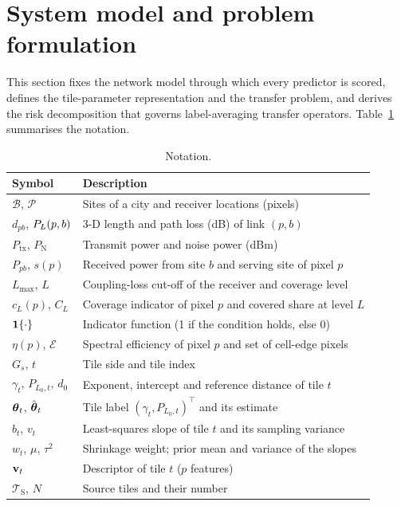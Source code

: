 \section{System model and problem formulation}
\label{sec:model}

This section fixes the network model through which every predictor is
scored, defines the tile-parameter representation and the transfer problem,
and derives the risk decomposition that governs label-averaging transfer
operators. Table~\ref{tab:notation} summarises the notation.

\begin{table}[!tp]
\centering
\caption{Notation.}
\label{tab:notation}
\footnotesize\setlength{\tabcolsep}{4pt}
\begin{tabular}{ll}
\toprule
Symbol & Description \\
\midrule
$\mathcal{B}$, $\mathcal{P}$ & Sites of a city and receiver locations (pixels) \\
$d_{pb}$, $P_{L}(p,b)$ & 3-D length and path loss (dB) of link $(p,b)$ \\
$P_{\mathrm{tx}}$, $P_{\mathrm{N}}$ & Transmit power and noise power (dBm) \\
$P_{pb}$, $s(p)$ & Received power from site $b$ and serving site of pixel $p$ \\
$L_{\max}$, $L$ & Coupling-loss cut-off of the receiver and coverage level \\
$c_L(p)$, $C_L$ & Coverage indicator of pixel $p$ and covered share at level $L$ \\
$\mathbf{1}\{\cdot\}$ & Indicator function (1 if the condition holds, else 0) \\
$\eta(p)$, $\mathcal{E}$ & Spectral efficiency of pixel $p$ and set of cell-edge pixels \\
$G_s$, $t$ & Tile side and tile index \\
$\gamma_t$, $P_{L_0,t}$, $d_0$ & Exponent, intercept and reference distance of tile $t$ \\
$\boldsymbol{\theta}_t$, $\hat{\boldsymbol{\theta}}_t$ & Tile label $(\gamma_t,P_{L_0,t})^{\top}$ and its estimate \\
$b_t$, $v_t$ & Least-squares slope of tile $t$ and its sampling variance \\
$w_t$, $\mu$, $\tau^{2}$ & Shrinkage weight; prior mean and variance of the slopes \\
$\mathbf{v}_t$ & Descriptor of tile $t$ ($p$ features) \\
$\mathcal{T}_{\mathrm{S}}$, $N$ & Source tiles and their number \\

\end{tabular}
\end{table}
